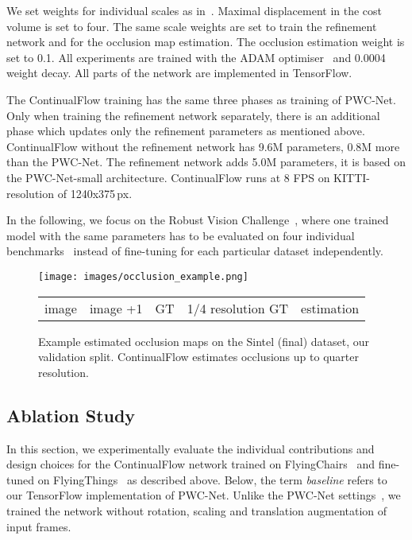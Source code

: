 \documentclass[runningheads]{llncs}
\begin{document}
We set weights for individual scales as in~\cite{Sun2017}.
Maximal displacement in the cost volume is set to four.
The same scale weights are set to train the refinement network and for the occlusion map estimation. The occlusion estimation weight  is set to 0.1. 
All experiments are trained with the ADAM optimiser~\cite{Kingma2014} and 0.0004 weight decay.
All parts of the network are implemented in TensorFlow.

The ContinualFlow training has the same three phases as training of PWC-Net.
Only when training the refinement network separately, there is an additional phase which updates only the refinement parameters as mentioned above.
ContinualFlow without the refinement network has 9.6M parameters, 0.8M more than the PWC-Net.
The refinement network adds 5.0M parameters, it is based on the PWC-Net-small architecture.
ContinualFlow runs at 8 FPS on KITTI-resolution of 1240x375\,px.

In the following, we focus on the Robust Vision Challenge~\cite{RVC2018}, where one trained model with the same parameters has to be evaluated on four individual benchmarks~\cite{Menze2015,Butler2012,Kondermann2016,Baker2011} instead of fine-tuning for each particular dataset independently.

\begin{figure*}[t]
\centering
\texttt{[image: images/occlusion\_example.png]}
\vspace{-1em}
\begin{tabular}{C{.192\linewidth}C{.192\linewidth}C{.192\linewidth}C{.192\linewidth}C{.192\linewidth}}
\scriptsize image  & \scriptsize image +1 & \scriptsize GT & \scriptsize 1/4 resolution GT & \scriptsize estimation
\end{tabular}
\caption{Example estimated occlusion maps on the Sintel (final) dataset, our validation split. ContinualFlow estimates occlusions up to quarter resolution.\vspace*{-2ex}}
\label{fig:occl_sintel}
\end{figure*}

\subsection{Ablation Study}
In this section, we experimentally evaluate the individual contributions and design choices for the ContinualFlow network trained on FlyingChairs~\cite{Dosovitskiy2015} and fine-tuned on FlyingThings~\cite{Mayer2016} as described above. 
Below, the term {\it baseline} refers to our TensorFlow implementation of PWC-Net.
Unlike the PWC-Net settings~\cite{Sun2017}, we trained  the network without rotation, scaling and translation augmentation of input frames.
\end{document}

